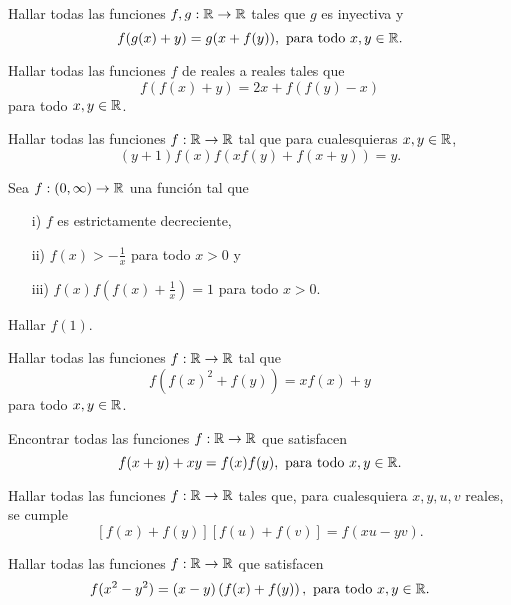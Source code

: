 \begin{exercise}
    Hallar todas las funciones $f,g : \mathbb{R} \to \mathbb{R}$ tales que $g$ es inyectiva y
    \[
        f(g(x) + y) = g(x + f(y)),\ \text{para todo}\ x,y \in \R.
    \]
\end{exercise}

\begin{exercise}
    Hallar todas las funciones $f$ de reales a reales tales que
    \[
        f(f(x) + y) = 2x + f(f(y) - x)
    \]
    para todo $x,y \in \mathbb{R}$.
\end{exercise}

\begin{exercise}
    Hallar todas las funciones $f : \mathbb{R} \to \mathbb{R}$ tal que para cualesquieras $x,y \in \mathbb{R}$,
    \[
        (y + 1)f(x)  f(x f(y) + f(x + y)) = y.
    \]
\end{exercise}

\begin{exercise}
    Sea $f: (0, \infty) \to \mathbb{R}$ una función tal que
    \begin{enumerate}
        \item[i)] $f$ es estrictamente decreciente,
        \item[ii)] $f(x) > - \frac{1}{x}$ para todo $x > 0$ y
        \item[iii)] $f(x)f\left(f(x) + \frac{1}{x}\right) = 1$ para todo $x > 0$.
    \end{enumerate}
    Hallar $f(1)$.
\end{exercise}

\begin{exercise}
    Hallar todas las funciones $f : \mathbb{R} \to \mathbb{R}$ tal que
    \[
        f\left(f(x)^2 + f(y)\right) = xf(x) + y
    \]
    para todo $x,y \in \mathbb{R}$.
\end{exercise}

\begin{prob-without-section}[India, 2010]
    Encontrar todas las funciones $f: \mathbb{R} \to \mathbb{R}$ que satisfacen
    \[
        f(x + y) + xy = f(x)f(y),\ \text{para todo}\ x,y \in \mathbb{R}.
    \]
\end{prob-without-section}

\begin{prob-without-section}[IMO, 2002]
    Hallar todas las funciones $f: \mathbb{R} \to \mathbb{R}$ tales que, para cualesquiera $x,y,u,v$ reales, se cumple
    \[
        \left[f(x) + f(y)\right]\left[f(u) + f(v)\right] = f(xu - yv).
    \]
\end{prob-without-section}

\begin{prob-without-section}[Korea, 2000]
    Hallar todas las funciones $f : \mathbb{R} \to \mathbb{R}$ que satisfacen
    \[
        f(x^2 - y^2) = (x - y)\left(f(x) + f(y)\right),\ \text{para todo}\ x,y \in \mathbb{R}.
    \]
\end{prob-without-section}

